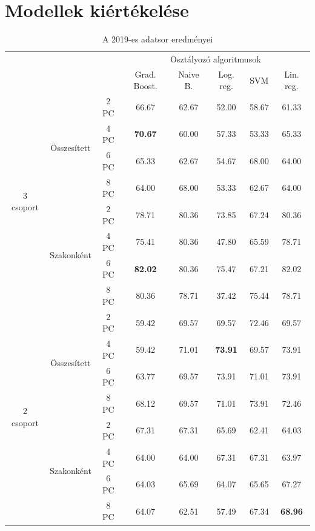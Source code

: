 \documentclass[12pt]{article}
\begin{document}
\section{Modellek kiértékelése}

\begin{table}[H]
\centering
\begin{tabular}{ccc|ccccc}

    &&&\multicolumn{5}{c}{Osztályozó algoritmusok} \\
    &&& Grad. Boost. &  Naive B. & Log. reg.  &  SVM & Lin. reg. \\ 
        \hline
    \multirow{8}{*}{3 csoport}& \multirow{4}{*}{Összesített}&2 PC&66.67&62.67&52.00&58.67&61.33 \\
    												&&4 PC&\textbf{70.67}&60.00&57.33&53.33&65.33\\
    												&&6 PC&65.33&62.67&54.67&68.00&64.00\\
    												&&8 PC&64.00&68.00&53.33&62.67&64.00\\\cline{3-8}%
    						& \multirow{4}{*}{Szakonként}&2 PC&78.71&80.36&73.85&67.24&80.36 \\
    												&&4 PC&75.41&80.36&47.80&65.59&78.71\\
    												&&6 PC&\textbf{82.02}&80.36&75.47&67.21&82.02\\
    												&&8 PC&80.36&78.71&37.42&75.44&78.71\\
    						 
    \hline
    \hline
    \multirow{8}{*}{2 csoport}& \multirow{4}{*}{Összesített}&2 PC&59.42&69.57&69.57&72.46&69.57\\
    												&&4 PC&59.42&71.01&\textbf{73.91}&69.57&73.91\\
    												&&6 PC&63.77&69.57&73.91&71.01&73.91\\
    												&&8 PC&68.12&69.57&71.01&73.91&72.46\\\cline{3-8}
    						 & \multirow{4}{*}{Szakonként}&2 PC&67.31&67.31&65.69&62.41&64.03\\
    												&&4 PC&64.00&64.00&67.31&67.31&63.97\\
    												&&6 PC&64.03&65.69&64.07&65.65&67.27\\
    												&&8 PC&64.07&62.51&57.49&67.34&\textbf{68.96}\\
    												\hline
\end{tabular}
\caption{A 2019-es adatsor eredményei}
\label{tab:multicol1}
\end{table}
\end{document}
